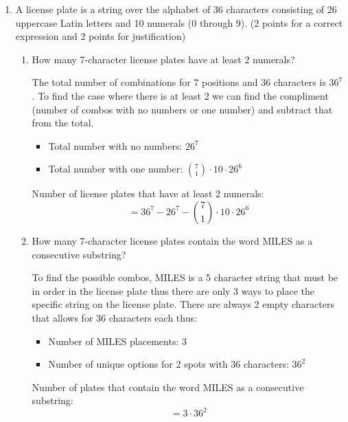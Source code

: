 \documentclass{article}
\begin{document}
\begin{enumerate}
\begin{enumerate}
      Assuming $P(k)$ is true. For $n \ge 1$, $P(k) \rightarrow P(k+1)$ is again equivalent for the left and right side.
      RHS $P(k+1)$
      \[
        (k+1) + 1 = k + 2
      \]
      Since we are assuming $P(k)$, we use the last factor of the product for the LHS and multiply it with the RHS and it should be equivalent to the RHS of $P(k+1)$:
      \[
        \prod_{j=1}^{k+1}\left(1+\frac{1}{j}\right)
        = \left[\prod_{j=1}^{k}\left(1+\frac{1}{j}\right)\right]\left(1+\frac{1}{k+1}\right)
      \]
      \[
        = (k+1)\left(1+\frac{1}{k+1}\right)
      \]
      \[
        = (k+1)\cdot\frac{k+2}{k+1}
      \]
      \[
        = k+2
      \]

      This proves that $P(k+1)$ is true assuming that $P(k)$ is true.
      Therefore, by mathematical induction,
      \[
        \prod_{k=1}^{n}\left(1+\frac{1}{k}\right)=n+1
      \]
      for all $n\geq 1$.

    \end{enumerate}
  
    \item A license plate is a string over the alphabet of 36 characters consisting of 26 uppercase Latin letters and 10 numerals (0 through 9). (2 points for a correct expression and 2 points for justification)
    \begin{enumerate}
      \item How many 7-character license plates have at least 2 numerals?

      The total number of combinations for 7 positions and 36 characters is $36^{7}$. To find the case where there is at least 2 we can find the compliment (number of combos with no numbers or one number) and subtract that from the total.
      \begin{itemize}
        \item Total number with no numbers: $26^{7}$
        \item Total number with one number: $\binom{7}{1} \cdot 10 \cdot 26^{6}$
      \end{itemize}
      Number of license plates that have at least 2 numerals:
      \[
         = 36^{7} - 26^{7} - \binom{7}{1} \cdot 10 \cdot 26^{6}
      \]

      \item How many 7-character license plates contain the word MILES as a consecutive substring?

      To find the possible combos, MILES is a 5 character string that must be in order in the license plate thus there are only 3 ways to place the specific string on the license plate. There are always 2 empty characters that allows for 36 characters each thus:
      \begin{itemize}
        \item Number of MILES placements: $3$
        \item Number of unique options for 2 spots with 36 characters: $36^{2}$
      \end{itemize}
      Number of plates that contain the word MILES as a consecutive substring:
      \[
        = 3 \cdot 36^{2}
      \]


\end{enumerate}
\end{enumerate}
\end{document}
